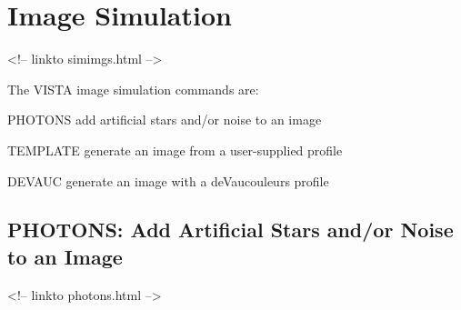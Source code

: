 \chapter{Image Simulation}
\begin{rawhtml}
<!-- linkto simimgs.html -->
\end{rawhtml}

%

The VISTA image simulation commands are:
\begin{example}
  \item[PHOTONS\hfill]{add artificial stars and/or noise to an image}
  \item[TEMPLATE\hfill]{generate an image from a user-supplied profile}
  \item[DEVAUC\hfill]{generate an image with a deVaucouleurs profile}
\end{example}

\section{PHOTONS: Add Artificial Stars and/or Noise to an Image}
\begin{rawhtml}
<!-- linkto photons.html -->
\end{rawhtml}

